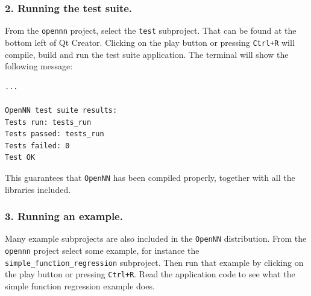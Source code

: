 \subsubsection*{2. Running the test suite.}

From the \lstinline"opennn" project, select the \lstinline"test" subproject. 
That can be found at the bottom left of Qt Creator.   
Clicking on the play button or pressing \lstinline"Ctrl+R" will compile, build and run the test suite application. 
The terminal will show the following message:

\begin{lstlisting}
...

OpenNN test suite results:
Tests run: tests_run
Tests passed: tests_run
Tests failed: 0
Test OK
\end{lstlisting}

This guarantees that \texttt{OpenNN} has been compiled properly, together with all the libraries included.

\subsubsection*{3. Running an example.}

Many example subprojects are also included in the \texttt{OpenNN} distribution.
From the \lstinline"opennn" project select some example, for instance the \lstinline"simple_function_regression" subproject.  
Then run that example by clicking on the play button or pressing \lstinline"Ctrl+R".
Read the application code to see what the simple function regression example does. 

